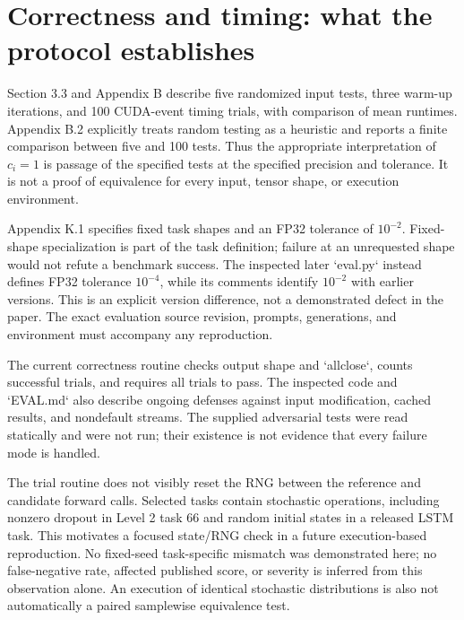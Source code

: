 \documentclass[10pt]{article}
\begin{document}
\section*{Correctness and timing: what the protocol establishes}
Section 3.3 and Appendix B describe five randomized input tests, three warm-up iterations, and 100 CUDA-event timing trials, with comparison of mean runtimes. Appendix B.2 explicitly treats random testing as a heuristic and reports a finite comparison between five and 100 tests. Thus the appropriate interpretation of \(c_i=1\) is passage of the specified tests at the specified precision and tolerance. It is not a proof of equivalence for every input, tensor shape, or execution environment.\par
Appendix K.1 specifies fixed task shapes and an FP32 tolerance of \(10^{-2}\). Fixed-shape specialization is part of the task definition; failure at an unrequested shape would not refute a benchmark success. The inspected later `eval.py` instead defines FP32 tolerance \(10^{-4}\), while its comments identify \(10^{-2}\) with earlier versions. This is an explicit version difference, not a demonstrated defect in the paper. The exact evaluation source revision, prompts, generations, and environment must accompany any reproduction.\par
The current correctness routine checks output shape and `allclose`, counts successful trials, and requires all trials to pass. The inspected code and `EVAL.md` also describe ongoing defenses against input modification, cached results, and nondefault streams. The supplied adversarial tests were read statically and were not run; their existence is not evidence that every failure mode is handled.\par
The trial routine does not visibly reset the RNG between the reference and candidate forward calls. Selected tasks contain stochastic operations, including nonzero dropout in Level 2 task 66 and random initial states in a released LSTM task. This motivates a focused state/RNG check in a future execution-based reproduction. No fixed-seed task-specific mismatch was demonstrated here; no false-negative rate, affected published score, or severity is inferred from this observation alone. An execution of identical stochastic distributions is also not automatically a paired samplewise equivalence test.\par
\end{document}
